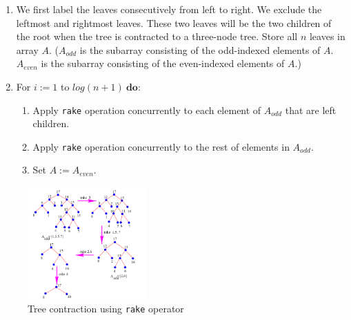 \documentclass[twoside]{article}
\begin{document}
\begin{enumerate}
    \item We first label the leaves consecutively from left to right.  We exclude the leftmost and rightmost leaves.  These two leaves will be the two children of the root when the tree is contracted to a three-node tree.  Store all $n$ leaves in array $A$.  ($A_{odd}$ is the subarray consisting of the odd-indexed elements of $A$.  $A_{even}$ is the subarray consisting of the even-indexed elements of $A$.)
    \item For $i:=1$ to $log(n+1) \ \textbf{do}:$
        \begin{enumerate}
            \item Apply \texttt{rake} operation concurrently to each element of $A_{odd}$ that are left children.
            \item Apply \texttt{rake} operation concurrently to the rest of elements in $A_{odd}$.
            \item Set $A:=A_{even}$.
        \end{enumerate}
\end{enumerate}


\begin{figure}[h]
  \begin{center}
    \includegraphics[width=0.4\textwidth]{finalrake.png}
  \end{center}
  \caption{Tree contraction using \texttt{rake} operator}
\end{figure}
\end{document}
